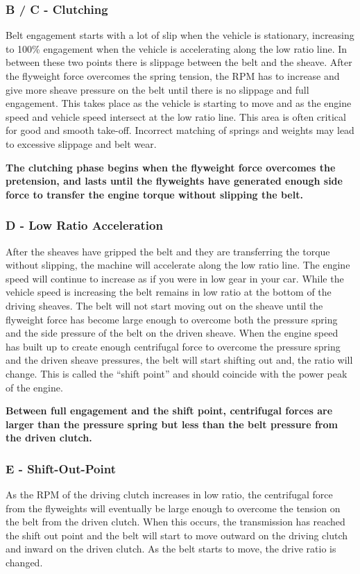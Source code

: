 \documentclass[12pt, titlepage]{article}
\begin{document}
\subsubsection*{B / C - Clutching}

Belt engagement starts with a lot of slip when the vehicle is stationary, increasing to 100\% engagement when the vehicle is accelerating along the low ratio line. In between these two points there is slippage between the belt and the sheave. After the flyweight force overcomes the spring tension, the RPM has to increase and give more sheave pressure on the belt until there is no slippage and full engagement. This takes place as the vehicle is starting to move and as the engine speed and vehicle speed intersect at the low ratio line. This area is often critical for good and smooth take-off. Incorrect matching of springs and weights may lead to excessive slippage and belt wear.

\textbf{The clutching phase begins when the flyweight force overcomes the pretension, and lasts until the flyweights have generated enough side force to transfer the engine torque without slipping the belt.}

\subsubsection*{D - Low Ratio Acceleration}

After the sheaves have gripped the belt and they are transferring the torque without slipping, the machine will accelerate along the low ratio line. The engine speed will continue to increase as if you were in low gear in your car. While the vehicle speed is increasing the belt remains in low ratio at the bottom of the driving sheaves. The belt will not start moving out on the sheave until the flyweight force has become large enough to overcome both the pressure spring and the side pressure of the belt on the driven sheave. When the engine speed has built up to create enough centrifugal force to overcome the pressure spring and the driven sheave pressures, the belt will start shifting out and, the ratio will change. This is called the “shift point” and should coincide with the power peak of the engine.

\textbf{Between full engagement and the shift point, centrifugal forces are larger than the pressure spring but less than the belt pressure from the driven clutch.}

\subsubsection*{E - Shift-Out-Point}
As the RPM of the driving clutch increases in low ratio, the centrifugal force from the flyweights will eventually be large enough to overcome the tension on the belt from the driven clutch. When this occurs, the transmission has reached the shift out point and the belt will start to move outward on the driving clutch and inward on the driven clutch. As the belt starts to move, the drive ratio is changed.
\end{document}
